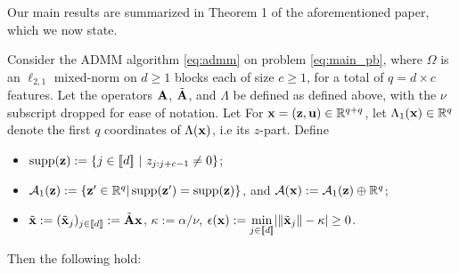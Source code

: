 Our main results are summarized in Theorem 1 of the aforementioned paper, which we now state.
\begin{theorem} Consider the ADMM algorithm \eqref{eq:admm} on problem
  \eqref{eq:main_pb}, where $\Omega$ is an $\ell_{2,1}$ mixed-norm on
  $d \ge 1$ blocks each of size $c \ge 1$, for a total of $q = d
  \times c$ features. Let the operators $\mathbf{A}$, $\tilde{\mathbf{A}}$, and $\Lambda$ be
  defined as defined above, with the $\nu$ subscript
  dropped for ease of notation. Let For $\mathbf{x} = (\mathbf{z}, \mathbf{u}) \in\mathbb{R}^{q+q}$, let $\Lambda_1(\mathbf{x}) \in \mathbb R^q$ denote the first $q$ coordinates of $\Lambda(\mathbf{x})$, i.e its $z$-part. Define
  \begin{itemize}
    \item $\operatorname{supp}(\mathbf{z}) := \{j\in[\![d]\!]\text{ }|\text{ }z_{j:j+c-1} \ne
      0\}$;
      \item $\mathcal{A}_1(\mathbf{z}) := \{\mathbf{z}' \in \mathbb{R}^{q} |
    \operatorname{supp}(\mathbf{z}') = \operatorname{supp}(\mathbf{z})\}$, and $\mathcal A(\mathbf{x}) := \mathcal A_1(\mathbf{z}) \oplus \mathbb R^q$;
   \item $\tilde{\mathbf{x}} := (\tilde{\mathbf{x}}_j)_{j \in [\![d]\!]} := \tilde{\mathbf{A}}\mathbf{x}$, $\kappa :=
    \alpha / \nu$, $\epsilon(\mathbf{x}) :=
      \underset{j \in [\![d]\!]}{\min}\text{}|\|\tilde{\mathbf{x}}_j\|-\kappa| \ge 0$.
    \end{itemize}
Then the following hold:
\end{theorem}
